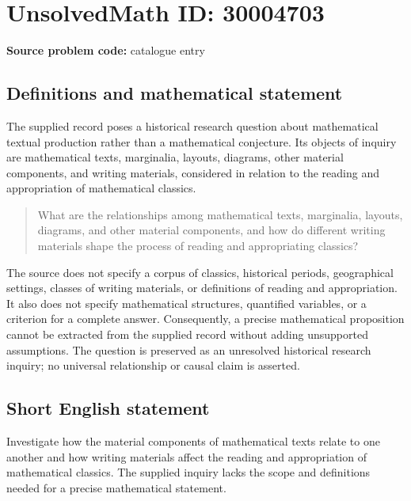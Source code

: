 \documentclass[11pt]{article}
\begin{document}
\section*{UnsolvedMath ID: 30004703}
\textbf{Source problem code:} catalogue entry
\subsection{Definitions and mathematical statement}
The supplied record poses a historical research question about mathematical textual production rather than a mathematical conjecture. Its objects of inquiry are mathematical texts, marginalia, layouts, diagrams, other material components, and writing materials, considered in relation to the reading and appropriation of mathematical classics.

\begin{quote}
What are the relationships among mathematical texts, marginalia, layouts, diagrams, and other material components, and how do different writing materials shape the process of reading and appropriating classics?
\end{quote}

The source does not specify a corpus of classics, historical periods, geographical settings, classes of writing materials, or definitions of reading and appropriation. It also does not specify mathematical structures, quantified variables, or a criterion for a complete answer. Consequently, a precise mathematical proposition cannot be extracted from the supplied record without adding unsupported assumptions. The question is preserved as an unresolved historical research inquiry; no universal relationship or causal claim is asserted.
\subsection{Short English statement}
Investigate how the material components of mathematical texts relate to one another and how writing materials affect the reading and appropriation of mathematical classics. The supplied inquiry lacks the scope and definitions needed for a precise mathematical statement.
\end{document}
